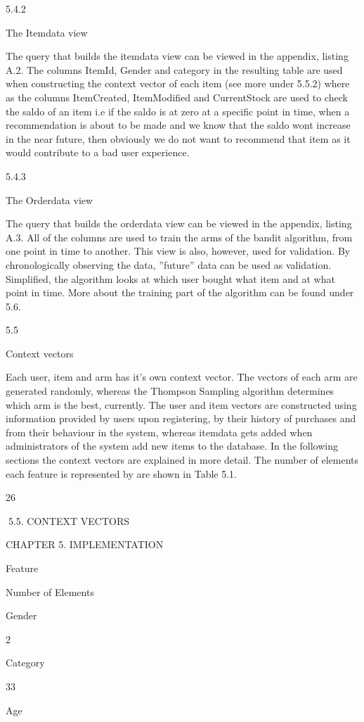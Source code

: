 5.4.2

The Itemdata view

The query that builds the itemdata view can be viewed in the appendix, listing A.2. The
columns ItemId, Gender and category in the resulting table are used when constructing
the context vector of each item (see more under 5.5.2) where as the columns ItemCreated,
ItemModified and CurrentStock are used to check the saldo of an item i.e if the saldo is
at zero at a specific point in time, when a recommendation is about to be made and we
know that the saldo wont increase in the near future, then obviously we do not want to
recommend that item as it would contribute to a bad user experience.

5.4.3

The Orderdata view

The query that builds the orderdata view can be viewed in the appendix, listing A.3. All
of the columns are used to train the arms of the bandit algorithm, from one point in time
to another. This view is also, however, used for validation. By chronologically observing
the data, ”future” data can be used as validation. Simplified, the algorithm looks at
which user bought what item and at what point in time. More about the training part
of the algorithm can be found under 5.6.

5.5

Context vectors

Each user, item and arm has it’s own context vector. The vectors of each arm are generated randomly, whereas the Thompson Sampling algorithm determines which arm is the
best, currently. The user and item vectors are constructed using information provided
by users upon registering, by their history of purchases and from their behaviour in the
system, whereas itemdata gets added when administrators of the system add new items
to the database.
In the following sections the context vectors are explained in more detail. The number of elements each feature is represented by are shown in Table 5.1.

26

5.5. CONTEXT VECTORS

CHAPTER 5. IMPLEMENTATION

Feature

Number of Elements

Gender

2

Category

33

Age

